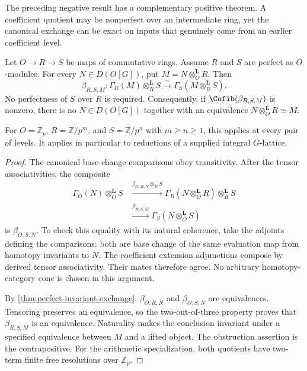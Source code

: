 The preceding negative result has a complementary positive theorem. A coefficient quotient may be nonperfect over an intermediate ring, yet the canonical exchange can be exact on inputs that genuinely come from an earlier coefficient level.

\begin{theorem}\label{thm:lifted-input-exchange}
Let $O\to R\to S$ be maps of commutative rings. Assume $R$ and $S$ are perfect as $O$-modules. For every $N\in D(O[G])$, put $M=N\otimes_O^{\mathbf L}R$. Then
\[
 \boxed{\beta_{R,S,M}:\Gamma_R(M)\otimes_R^{\mathbf L}S
 \xrightarrow{\sim}\Gamma_S(M\otimes_R^{\mathbf L}S).}
\]
No perfectness of $S$ over $R$ is required. Consequently, if $\Cofib(\beta_{R,S,M})$ is nonzero, there is no $N\in D(O[G])$ together with an equivalence $N\otimes_O^{\mathbf L}R\simeq M$.

For $O=\mathbb Z_p$, $R=\mathbb Z/p^m$, and $S=\mathbb Z/p^n$ with $m\geq n\geq1$, this applies at every pair of levels. It applies in particular to reductions of a supplied integral $G$-lattice.
\end{theorem}
\begin{proof}
The canonical base-change comparisons obey transitivity. After the tensor associativities, the composite
\[
 \begin{split}
 \Gamma_O(N)\otimes_O^{\mathbf L}S
 &\xrightarrow{\beta_{O,R,N}\otimes_R S}
 \Gamma_R(N\otimes_O^{\mathbf L}R)\otimes_R^{\mathbf L}S\\
 &\xrightarrow{\beta_{R,S,M}}
 \Gamma_S(N\otimes_O^{\mathbf L}S)
 \end{split}
\]
is $\beta_{O,S,N}$. To check this equality with its natural coherence, take the adjoints defining the comparisons: both are base change of the same evaluation map from homotopy invariants to $N$. The coefficient extension adjunctions compose by derived tensor associativity. Their mates therefore agree. No arbitrary homotopy-category cone is chosen in this argument.

By \cref{thm:perfect-invariant-exchange}, $\beta_{O,R,N}$ and $\beta_{O,S,N}$ are equivalences. Tensoring preserves an equivalence, so the two-out-of-three property proves that $\beta_{R,S,M}$ is an equivalence. Naturality makes the conclusion invariant under a specified equivalence between $M$ and a lifted object. The obstruction assertion is the contrapositive. For the arithmetic specialization, both quotients have two-term finite free resolutions over $\mathbb Z_p$.
\end{proof}

